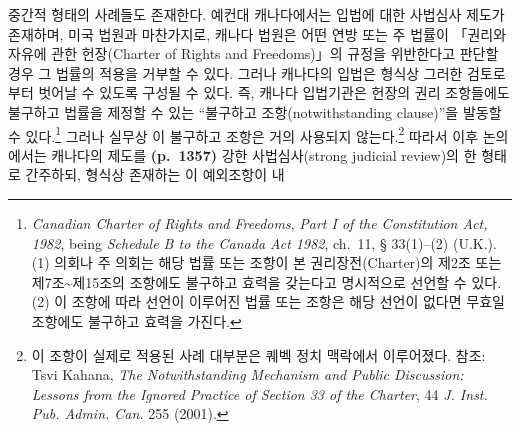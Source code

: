 \documentclass[a4paper,12pt,oneside]{article}  %
\begin{document}
중간적 형태의 사례들도 존재한다. 예컨대 캐나다에서는 입법에 대한
사법심사 제도가 존재하며, 미국 법원과 마찬가지로, 캐나다 법원은 어떤
연방 또는 주 법률이 「권리와 자유에 관한 헌장(Charter of Rights and
Freedoms)」의 규정을 위반한다고 판단할 경우 그 법률의 적용을 거부할 수
있다. 그러나 캐나다의 입법은 형식상 그러한 검토로부터 벗어날 수 있도록
구성될 수 있다. 즉, 캐나다 입법기관은 헌장의 권리 조항들에도 불구하고
법률을 제정할 수 있는 ``불구하고 조항(notwithstanding clause)''을 발동할
수 있다.\footnote{\emph{Canadian Charter of Rights and Freedoms},
  \emph{Part I of the Constitution Act, 1982}, being \emph{Schedule B to
  the Canada Act 1982}, ch.~11, § 33(1)--(2) (U.K.). (1) 의회나 주
  의회는 해당 법률 또는 조항이 본 권리장전(Charter)의 제2조 또는
  제7조\textasciitilde 제15조의 조항에도 불구하고 효력을 갖는다고
  명시적으로 선언할 수 있다. (2) 이 조항에 따라 선언이 이루어진 법률
  또는 조항은 해당 선언이 없다면 무효일 조항에도 불구하고 효력을 가진다.}
그러나 실무상 이 불구하고 조항은 거의 사용되지 않는다.\footnote{이
  조항이 실제로 적용된 사례 대부분은 퀘벡 정치 맥락에서 이루어졌다.
  참조: Tsvi Kahana, \emph{The Notwithstanding Mechanism and Public
  Discussion: Lessons from the Ignored Practice of Section 33 of the
  Charter}, 44 \emph{J. Inst. Pub. Admin. Can.} 255 (2001).} 따라서 이후
논의에서는 캐나다의 제도를 \textbf{(p.~1357)} 강한 사법심사(strong
judicial review)의 한 형태로 간주하되, 형식상 존재하는 이 예외조항이 내
\end{document}
